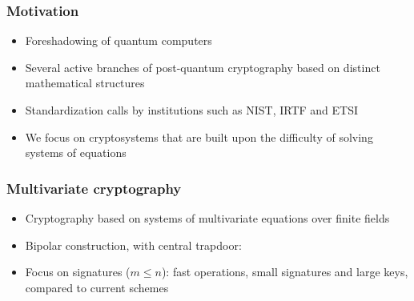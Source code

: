 \documentclass[12pt]{beamer}
\begin{document}
\begin{frame}
  \frametitle{Motivation}
  \begin{itemize}
    \item Foreshadowing of quantum computers
    \item Several active branches of post-quantum cryptography based on
        distinct mathematical structures
    \item Standardization calls by institutions such as NIST, IRTF and ETSI
    \item We focus on cryptosystems that are built upon the difficulty of
        solving systems of equations
  \end{itemize}
\end{frame}

\begin{frame}
  \frametitle{Multivariate cryptography}
  \begin{itemize}
    \item Cryptography based on systems of multivariate equations over finite
        fields
    \item Bipolar construction, with central trapdoor:
    \begin{figure}
      \vspace{2mm}
      \centering
    \end{figure}
    \item Focus on signatures ($m \leq n$): fast operations, small signatures
        and large keys, compared to current schemes
  \end{itemize}
\end{frame}
\end{document}
